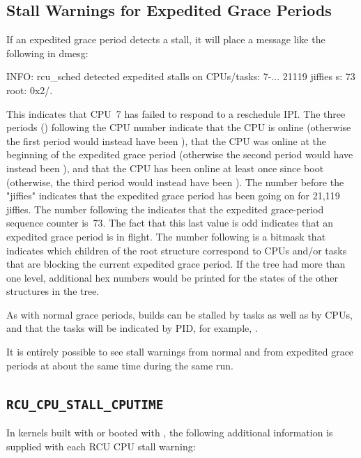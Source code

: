 \subsection{Stall Warnings for Expedited Grace Periods}

If an expedited grace period detects a stall, it will place a message
like the following in dmesg:

\begin{VerbatimU}[breaklines=true]
	INFO: rcu_sched detected expedited stalls on CPUs/tasks: { 7-... } 21119 jiffies s: 73 root: 0x2/.
\end{VerbatimU}

This indicates that CPU~7 has failed to respond to a reschedule IPI\@.
The three periods () following the CPU number indicate that the CPU
is online (otherwise the first period would instead have been ),
that the CPU was online at the beginning of the expedited grace period
(otherwise the second period would have instead been ), and that
the CPU has been online at least once since boot (otherwise, the third
period would instead have been ).
The number before the "jiffies"
indicates that the expedited grace period has been going on for 21,119
jiffies.
The number following the  indicates that the expedited
grace-period sequence counter is~73.
The fact that this last value is
odd indicates that an expedited grace period is in flight.
The number
following  is a bitmask that indicates which children of the root
 structure correspond to CPUs and/or tasks that are blocking the
current expedited grace period.
If the tree had more than one level,
additional hex numbers would be printed for the states of the other
 structures in the tree.

As with normal grace periods,  builds can be stalled by
tasks as well as by CPUs, and that the tasks will be indicated by PID,
for example, .

It is entirely possible to see stall warnings from normal and from
expedited grace periods at about the same time during the same run.

\subsection{\texttt{RCU\_CPU\_STALL\_CPUTIME}}

In kernels built with  or booted with
, the following additional information
is supplied with each RCU CPU stall warning:

